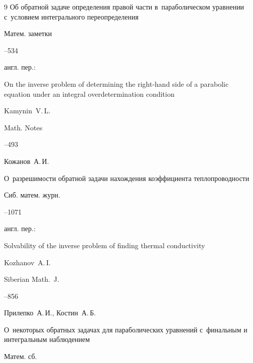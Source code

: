 \begin{thebibliography}{9}
\paper Об обратной задаче определения правой части в~параболическом уравнении с~условием интегрального переопределения

\jour Матем. заметки




--534

\transl англ. пер.:~

\paper On the inverse problem of determining the right-hand side of a parabolic equation under an integral overdetermination condition

\by Kamynin~V.\,L.

\jour Math. Notes




--493




\by Кожанов~А.\,И.

\paper О~разрешимости обратной задачи нахождения коэффициента теплопроводности

\jour Сиб. матем. журн.




--1071

\transl англ. пер.:~

\paper Solvability of the inverse problem of finding thermal conductivity

\by  Kozhanov~A.\,I.

\jour Siberian Math.~J.




--856




\by Прилепко~А.\,И., Костин~А.\,Б.

\paper О~некоторых обратных задачах для параболических уравнений с~финальным и интегральным наблюдением

\jour Матем. сб.





\end{thebibliography}
